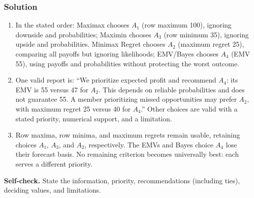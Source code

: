 \subsubsection*{Solution}
\begin{enumerate}
\item In the stated order: Maximax chooses $A_1$ (row maximum 100), ignoring downside and probabilities; Maximin chooses $A_3$ (row minimum 35), ignoring upside and probabilities. Minimax Regret chooses $A_2$ (maximum regret 25), comparing all payoffs but ignoring likelihoods; EMV/Bayes chooses $A_4$ (EMV 55), using payoffs and probabilities without protecting the worst outcome.
\item One valid report is: ``We prioritize expected profit and recommend $A_4$: its EMV is 55 versus 47 for $A_2$. This depends on reliable probabilities and does not guarantee 55. A member prioritizing missed opportunities may prefer $A_2$, with maximum regret 25 versus 40 for $A_4$.'' Other choices are valid with a stated priority, numerical support, and a limitation.
\item Row maxima, row minima, and maximum regrets remain usable, retaining choices $A_1$, $A_3$, and $A_2$, respectively. The EMVs and Bayes choice $A_4$ lose their forecast basis. No remaining criterion becomes universally best: each serves a different priority.
\end{enumerate}
\textbf{Self-check.} State the information, priority, recommendations (including ties), deciding values, and limitations.

